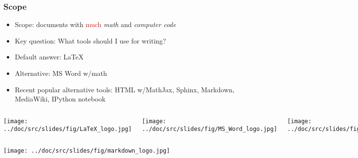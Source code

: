 \documentclass{beamer}
\begin{document}
\begin{frame}
\frametitle{Scope}


\begin{itemize}
\pause
  \item Scope: documents with \textcolor{red}{much} \emph{math} and \emph{computer code}

\pause
  \item Key question: What tools should I use for writing?

\pause
  \item Default answer: {\LaTeX}

\pause
  \item Alternative: MS Word w/math

\pause
  \item Recent popular alternative tools: HTML w/MathJax,
    Sphinx, Markdown, MediaWiki, IPython notebook
\end{itemize}

\noindent

\begin{columns}
\vspace{6mm}

\centerline{\texttt{[image: ../doc/src/slides/fig/LaTeX\_logo.jpg]}}

\vspace{6mm}


\vspace{6mm}

\centerline{\texttt{[image: ../doc/src/slides/fig/MS\_Word\_logo.jpg]}}

\vspace{6mm}


\vspace{6mm}

\centerline{\texttt{[image: ../doc/src/slides/fig/sphinx\_logo.png]}}

\vspace{6mm}


\end{columns}
\begin{columns}
\vspace{6mm}

\centerline{\texttt{[image: ../doc/src/slides/fig/markdown\_logo.jpg]}}


\end{columns}
\end{frame}
\end{document}
